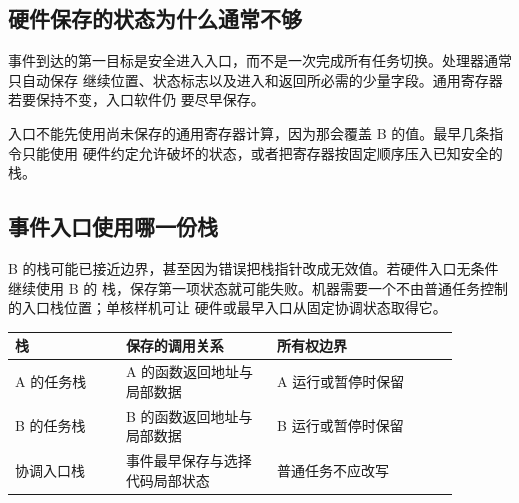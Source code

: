 \subsection{硬件保存的状态为什么通常不够}

事件到达的第一目标是安全进入入口，而不是一次完成所有任务切换。处理器通常只自动保存
继续位置、状态标志以及进入和返回所必需的少量字段。通用寄存器若要保持不变，入口软件仍
要尽早保存。

\begin{center}
\end{center}

入口不能先使用尚未保存的通用寄存器计算，因为那会覆盖 B 的值。最早几条指令只能使用
硬件约定允许破坏的状态，或者把寄存器按固定顺序压入已知安全的栈。

\subsection{事件入口使用哪一份栈}

B 的栈可能已接近边界，甚至因为错误把栈指针改成无效值。若硬件入口无条件继续使用 B 的
栈，保存第一项状态就可能失败。机器需要一个不由普通任务控制的入口栈位置；单核样机可让
硬件或最早入口从固定协调状态取得它。

\begin{longtable}{|L{0.22\linewidth}|L{0.30\linewidth}|L{0.36\linewidth}|}
\hline
{}
栈 & 保存的调用关系 & 所有权边界 \\ \hline
A 的任务栈 & A 的函数返回地址与局部数据 & A 运行或暂停时保留 \\ \hline
B 的任务栈 & B 的函数返回地址与局部数据 & B 运行或暂停时保留 \\ \hline
协调入口栈 & 事件最早保存与选择代码局部状态 & 普通任务不应改写 \\ \hline
\end{longtable}

